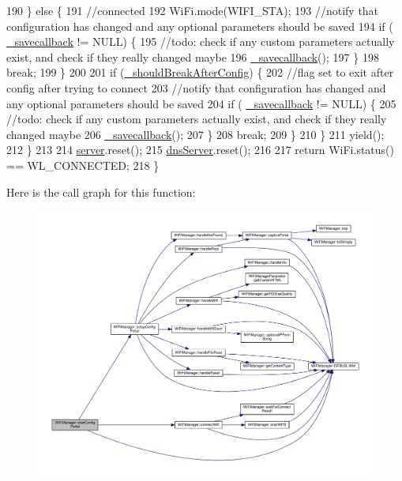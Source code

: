 \begin{DoxyCode}
190       \} \textcolor{keywordflow}{else} \{
191         \textcolor{comment}{//connected}
192         WiFi.mode(WIFI\_STA);
193         \textcolor{comment}{//notify that configuration has changed and any optional parameters should be saved}
194         \textcolor{keywordflow}{if} ( \hyperlink{class_wi_fi_manager_a9a316060184788e33e71d88101cb2e0d}{\_savecallback} != NULL) \{
195           \textcolor{comment}{//todo: check if any custom parameters actually exist, and check if they really changed maybe}
196           \hyperlink{class_wi_fi_manager_a9a316060184788e33e71d88101cb2e0d}{\_savecallback}();
197         \}
198         \textcolor{keywordflow}{break};
199       \}
200 
201       \textcolor{keywordflow}{if} (\hyperlink{class_wi_fi_manager_adf42bd3bb7ac538e97407f66e5170858}{\_shouldBreakAfterConfig}) \{
202         \textcolor{comment}{//flag set to exit after config after trying to connect}
203         \textcolor{comment}{//notify that configuration has changed and any optional parameters should be saved}
204         \textcolor{keywordflow}{if} ( \hyperlink{class_wi_fi_manager_a9a316060184788e33e71d88101cb2e0d}{\_savecallback} != NULL) \{
205           \textcolor{comment}{//todo: check if any custom parameters actually exist, and check if they really changed maybe}
206           \hyperlink{class_wi_fi_manager_a9a316060184788e33e71d88101cb2e0d}{\_savecallback}();
207         \}
208         \textcolor{keywordflow}{break};
209       \}
210     \}
211     yield();
212   \}
213 
214   \hyperlink{class_wi_fi_manager_a509523a01c0395cf0dc235b074f2a5ea}{server}.reset();
215   \hyperlink{class_wi_fi_manager_af44ccd00daee619a7bcc89000fa063ca}{dnsServer}.reset();
216 
217   \textcolor{keywordflow}{return}  WiFi.status() == WL\_CONNECTED;
218 \}
\end{DoxyCode}
Here is the call graph for this function\+:
\nopagebreak
\begin{figure}[H]
\begin{center}
\leavevmode
\includegraphics[width=350pt]{d4/dc8/class_wi_fi_manager_afaca5021edffb4d9a5bd39f7b0f7a686_cgraph}
\end{center}
\end{figure}

